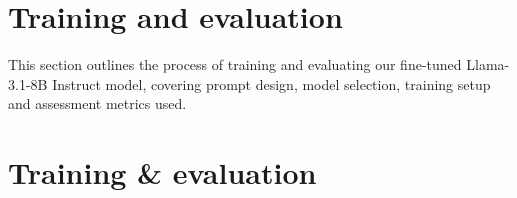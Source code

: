 







\section{Training and evaluation}

This section outlines the process of training and evaluating our fine-tuned Llama-3.1-8B Instruct model, covering prompt design, model selection, training setup and assessment metrics used.


\section{Training & evaluation}

